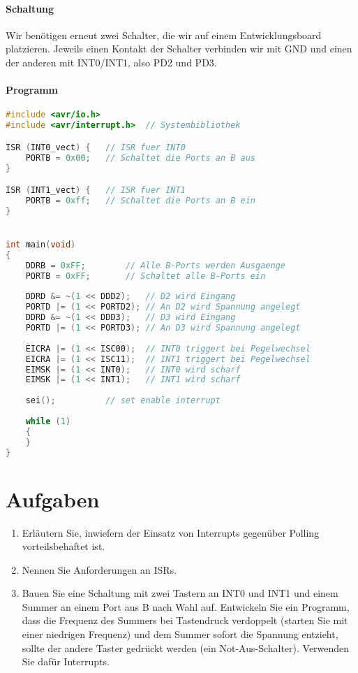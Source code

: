 \documentclass[11pt,a4paper]{scrartcl}
\begin{document}
\paragraph{Schaltung}
Wir benötigen erneut zwei Schalter, die wir auf einem Entwicklungsboard platzieren. Jeweils einen Kontakt der Schalter verbinden wir mit GND und einen der anderen mit INT0/INT1, also PD2 und PD3.
\paragraph{Programm}\quad
\begin{lstlisting}[language=C]
#include <avr/io.h>
#include <avr/interrupt.h>	// Systembibliothek

ISR (INT0_vect) {	// ISR fuer INT0
	PORTB = 0x00;	// Schaltet die Ports an B aus
}			

ISR (INT1_vect) {	// ISR fuer INT1
	PORTB = 0xff;	// Schaltet die Ports an B ein
}


int main(void)
{
	DDRB = 0xFF;		// Alle B-Ports werden Ausgaenge
	PORTB = 0xFF;		// Schaltet alle B-Ports ein 
	
	DDRD &= ~(1 << DDD2); 	// D2 wird Eingang
	PORTD |= (1 << PORTD2);	// An D2 wird Spannung angelegt
	DDRD &= ~(1 << DDD3);	// D3 wird Eingang
	PORTD |= (1 << PORTD3);	// An D3 wird Spannung angelegt
	
	EICRA |= (1 << ISC00);	// INT0 triggert bei Pegelwechsel
	EICRA |= (1 << ISC11);	// INT1 triggert bei Pegelwechsel
	EIMSK |= (1 << INT0);	// INT0 wird scharf
	EIMSK |= (1 << INT1);	// INT1 wird scharf
	
	sei();			// set enable interrupt
	
    while (1) 
    {
    }
}
\end{lstlisting}
\section*{Aufgaben}
\begin{enumerate}
\item Erläutern Sie, inwiefern der Einsatz von Interrupts gegenüber Polling vorteilsbehaftet ist.
\item Nennen Sie Anforderungen an ISRs.
\item Bauen Sie eine Schaltung mit zwei Tastern an INT0 und INT1 und einem Summer an einem Port aus B nach Wahl auf. Entwickeln Sie ein Programm, dass die Frequenz des Summers bei Tastendruck verdoppelt (starten Sie mit einer niedrigen Frequenz) und dem Summer sofort die Spannung entzieht, sollte der andere Taster gedrückt werden (ein Not-Aus-Schalter). Verwenden Sie dafür Interrupts.
\end{enumerate}
\pagebreak
\end{document}
